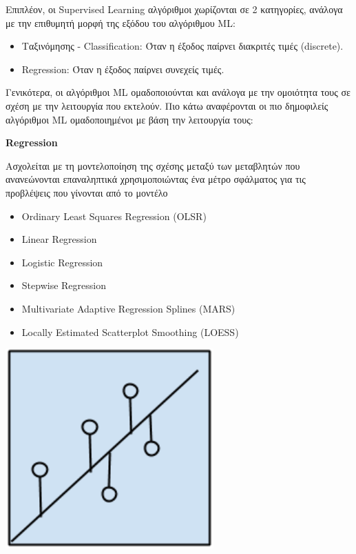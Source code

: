 Επιπλέον, οι Supervised Learning αλγόριθμοι χωρίζονται σε 2 κατηγορίες, ανάλογα
με την επιθυμητή μορφή της εξόδου του αλγόριθμου ML:
\begin{itemize}
  \item{Ταξινόμησης - Classification: Όταν η έξοδος παίρνει διακριτές τιμές (discrete).}
  \item{Regression: Όταν η έξοδος παίρνει συνεχείς τιμές.}
\end{itemize}

Γενικότερα, οι αλγόριθμοι ML ομαδοποιούνται και ανάλογα με την ομοιότητα τους
σε σχέση με την λειτουργία που εκτελούν. Πιο κάτω αναφέρονται οι πιο δημοφιλείς
αλγόριθμοι ML ομαδοποιημένοι με βάση την λειτουργία τους:
\\

\begin{minipage}{0.5\textwidth}

  \textbf{\large Regression}

  Ασχολείται με τη μοντελοποίηση της σχέσης μεταξύ των μεταβλητών που ανανεώνονται επαναληπτικά
  χρησιμοποιώντας ένα μέτρο σφάλματος για τις προβλέψεις που γίνονται από το μοντέλο
  \begin{itemize}
    \setlength\itemsep{0em}
    \item{Ordinary Least Squares Regression (OLSR)}
    \item{Linear Regression}
    \item{Logistic Regression}
    \item{Stepwise Regression}
    \item{Multivariate Adaptive Regression Splines (MARS)}
    \item{Locally Estimated Scatterplot Smoothing (LOESS)}
  \end{itemize}
\end{minipage}
\begin{minipage}{0.5\textwidth}
  \begin{center}
    \includegraphics[width=0.6\textwidth]{./images/chapter3/regression_algorithms.png}
  \end{center}
\end{minipage}

